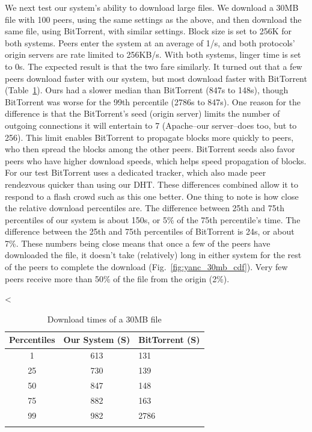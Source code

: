 We next test our system's ability to download large files.  We download a 30MB file with 100 peers, using the same settings as the above, and then download the same file, using BitTorrent, with similar settings.  Block size is set to 256K for both systems.  Peers enter the system at an average of 1/s, and both protocols' origin servers are rate limited to 256KB/s.  With both systems, linger time is set to 0s.  The expected result is that the two fare similarly.  It turned out that a few peers download faster with our system, but most download faster with BitTorrent (Table~\ref{fig:yanc_vs_bt}).  Ours had a slower median than BitTorrent (847s to 148s), though BitTorrent was worse for the 99th percentile (2786s to 847s).  One reason for the difference is that the BitTorrent's seed (origin server) limits the number of outgoing connections it will entertain to 7 (Apache--our server--does too, but to 256).  This limit enables BitTorrent to propagate blocks more quickly to peers, who then spread the blocks among the other peers.  BitTorrent seeds also favor peers who have higher download speeds, which helps speed propagation of blocks.  For our test BitTorrent uses a dedicated tracker, which also made peer rendezvous quicker than using our DHT.  These differences combined allow it to respond to a flash crowd such as this one better.  One thing to note is how close the relative download percentiles are. The difference between 25th and 75th percentiles of our system is about 150s, or 5\% of the 75th percentile's time.  The difference between the 25th and 75th percentiles of BitTorrent is 24s, or about 7\%.  These numbers being close means that once a few of the peers have downloaded the file, it doesn't take (relatively) long in either system for the rest of the peers to complete the download (Fig.~\ref{fig:yanc_30mb_cdf}).  Very few peers receive more than 50\% of the file from the origin (2\%).

<%

\begin{table}
  \caption{Download times of a 30MB file}
\begin{tabular}{ c c l }
  Percentiles & Our System (S) & BitTorrent (S) \\
  \hline
  1 & 613 & 131 \\
  25 & 730 & 139 \\
  50 & 847 & 148 \\
  75 & 882 & 163 \\
  99 & 982 & 2786 \\
  \label{fig:yanc_vs_bt}
\end{tabular}
\end{table}
  
